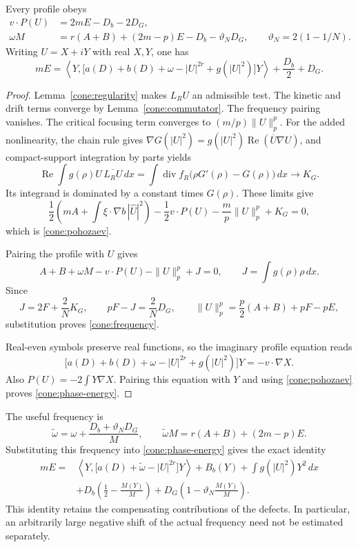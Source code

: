 \begin{lemma}\label{cone:identities}
Every profile obeys
\begin{align}
v\cdot P(U)&=2mE-D_b-2D_G,\label{cone:pohozaev}\\
\omega M&=r(A+B)+(2m-p)E-D_b-\vartheta_ND_G,
\qquad \vartheta_N=2(1-1/N).\label{cone:frequency}
\end{align}
Writing \(U=X+iY\) with real \(X,Y\), one has
\begin{equation}\label{cone:phase-energy}
mE=\left\langle Y,
\bigl[a(D)+b(D)+\omega-|U|^{2r}+g(|U|^2)\bigr]Y\right\rangle
+\frac{D_b}{2}+D_G.
\end{equation}
\end{lemma}
\begin{proof}
Lemma~\ref{cone:regularity} makes \(L_RU\) an admissible test.
The kinetic and drift terms converge by
Lemma~\ref{cone:commutator}. The frequency pairing vanishes.
The critical focusing term converges to
\((m/p)\|U\|_p^p\). For the added nonlinearity, the chain rule gives
\(\nabla G(|U|^2)=g(|U|^2)\operatorname{Re}(\overline U\nabla U)\),
and compact-support integration by parts yields
\[
\operatorname{Re}\int g(\rho)U\,\overline{L_RU}\,dx
=\int\operatorname{div}f_R\bigl(\rho G'(\rho)-G(\rho)\bigr)\,dx
\longrightarrow K_G.
\]
Its integrand is dominated by a constant times \(G(\rho)\).
These limits give
\[
\frac12\left(mA+\int\xi\cdot\nabla b\,|\widehat U|^2\right)
-\frac12v\cdot P(U)-\frac mp\|U\|_p^p+K_G=0,
\]
which is \eqref{cone:pohozaev}.

Pairing the profile with \(U\) gives
\[
A+B+\omega M-v\cdot P(U)-\|U\|_p^p+J=0,
\qquad J=\int g(\rho)\rho\,dx.
\]
Since
\[
J=2F+\frac2N K_G,\qquad
pF-J=\frac2N D_G,\qquad
\|U\|_p^p=\frac p2(A+B)+pF-pE,
\]
substitution proves \eqref{cone:frequency}.

Real-even symbols preserve real functions, so the imaginary
profile equation reads
\[
\bigl[a(D)+b(D)+\omega-|U|^{2r}+g(|U|^2)\bigr]Y
=-v\cdot\nabla X.
\]
Also \(P(U)=-2\int Y\nabla X\). Pairing this equation with \(Y\)
and using \eqref{cone:pohozaev} proves
\eqref{cone:phase-energy}.
\end{proof}

The useful frequency is
\begin{equation}\label{cone:shifted-frequency}
\widetilde\omega=\omega+\frac{D_b+\vartheta_ND_G}{M},
\qquad
\widetilde\omega M=r(A+B)+(2m-p)E.
\end{equation}
Substituting this frequency into \eqref{cone:phase-energy} gives
the exact identity
\begin{equation}\label{cone:shifted-identity}
\begin{aligned}
mE={}&
\left\langle Y,\bigl[a(D)+\widetilde\omega-|U|^{2r}\bigr]Y\right\rangle
+B_b(Y)+\int g(|U|^2)Y^2\,dx\\
&+D_b\left(\frac12-\frac{M(Y)}M\right)
+D_G\left(1-\vartheta_N\frac{M(Y)}M\right).
\end{aligned}
\end{equation}
This identity retains the compensating contributions of the
defects. In particular, an arbitrarily large negative shift of
the actual frequency need not be estimated separately.

